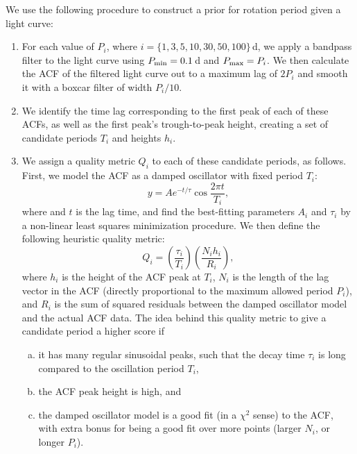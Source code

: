 \documentclass[useAMS, usenatbib, preprint, 12pt]{aastex}
\begin{document}
We use the following procedure to construct a prior for rotation period
given a light curve:
\begin{enumerate}
\item{For each value of $P_i$, where $i = \{1, 3, 5, 10, 30, 50, 100\}$\,d,
we apply a bandpass filter to the light curve using $P_{\rm min}=0.1$\,d
and $P_{\rm max} = P_i$.  We then calculate the ACF of the filtered 
light curve out to a maximum lag of $2P_i$ and smooth it with a boxcar 
filter of width $P_i/10$.}

\item{We identify the time lag corresponding to the 
first peak of each of these ACFs, as well as the first peak's
trough-to-peak height, creating a set of candidate periods
$T_i$ and heights $h_i$.}

\item{We assign a quality metric $Q_i$ to each of these candidate
periods, as follows.  First, we model the ACF as a 
damped oscillator with fixed period $T_i$:
\begin{equation}
y = A e^{-t/\tau} \cos{\frac{2\pi t}{T_i} },
\end{equation}
where and $t$ is the lag time, 
and find the best-fitting parameters $A_i$ and $\tau_i$ by a non-linear
least squares minimization procedure.  We then define the
following heuristic quality metric:
\begin{equation}
\label{eq:quality}
Q_i = \left(\frac{\tau_i}{T_i}\right) \left(\frac{N_i h_i}{R_i}\right),
\end{equation}
where $h_i$ is the height of the ACF peak at $T_i$, 
$N_i$ is the length of the lag vector in the ACF (directly proportional
to the maximum allowed period $P_i$), 
and $R_i$ is the sum of squared residuals between the 
damped oscillator model and the actual ACF data.  The idea behind this 
quality metric to give a candidate period a higher score if

    \begin{enumerate}[(a)]

    \item{it has many regular sinusoidal peaks, such that the decay
        time $\tau_i$ is long compared to the oscillation period $T_i$,}
    \item{the ACF peak height is high, and}
    \item{the damped oscillator model is a good fit (in a $\chi^2$
      sense) to the ACF, with extra bonus for being 
      a good fit over more points (larger $N_i$, or longer $P_i$).}


\end{enumerate}}
\end{enumerate}
\end{document}

